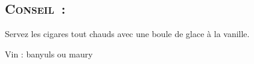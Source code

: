 \subsection*{\textsc{Conseil~:}}
Servez les cigares tout chauds avec une boule de glace à la vanille.

Vin : banyuls ou maury
